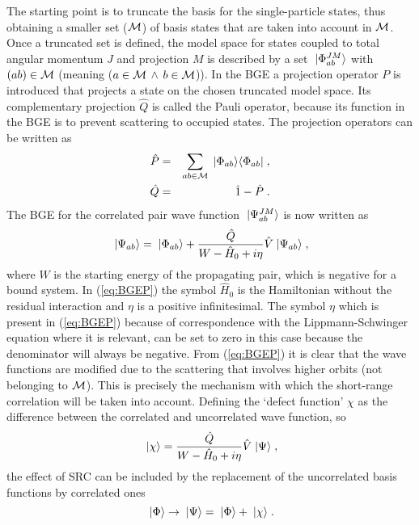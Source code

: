 The starting point is to truncate the basis for the single-particle states,
thus obtaining a smaller
set ($\calM$) of basis states that are taken into account in $\calM$. 
Once a truncated set is defined,
the model
space for states coupled to total angular momentum $J$ and projection $M$ is
described by a set $\;| \Phi^{JM}_{ab} \rangle$ with 
 $(ab) \in \calM$ (meaning ($a\in\calM$ $\wedge$ $b\in\calM$)). 
In the BGE 
a projection operator $P$ is introduced that projects a state on the chosen
truncated model space. Its complementary projection $\hat{Q}$ is called
the Pauli operator, because its function in the BGE is to prevent scattering
to occupied states. The projection operators can be written as
%
	\begin{eqnarray}
		\hat{P}
	&=&
		\sum_{ab \in \calM}
		\ket{ \Phi_{ab} }
		\bra{ \Phi_{ab} }
	\;,
	\nonumber \\
		\hat{Q}
	&=&
		\hat{1}-\hat{P}
	\;.
	\end{eqnarray}
%
The BGE for the correlated pair wave function $\;| \Psi^{JM}_{ab} \rangle$ is 
now written as
%
	\begin{equation}
		\;| \Psi_{ab} \rangle
	=
		\;| \Phi_{ab} \rangle
	+
		\frac{\hat{Q}}
		{W - \hat{H}_0 + i\eta}
		\hat{V}
		\;| \Psi_{ab} \rangle
	\label{eq:BGEP}
	\;,
	\end{equation}
%
where $W$ is the starting energy of the propagating pair, which is negative for
a bound system. In (\ref{eq:BGEP}) the symbol $\hat{H}_0$ is the Hamiltonian 
without the residual interaction and $\eta$
is a positive 
infinitesimal. The symbol $\eta$ which is present in (\ref{eq:BGEP}) because
of correspondence with the Lippmann-Schwinger equation where it is relevant,
can be set to zero in this case because the denominator will always be 
negative.
{}From (\ref{eq:BGEP}) it is clear that the wave functions are modified
due to the scattering that involves higher orbits (not belonging to $\calM$).
This is precisely the mechanism with which the short-range correlation will 
be taken into account. Defining the `defect function' $\chi$  as the 
difference between the correlated and uncorrelated wave function, so
%
	\begin{equation}
		\;| \chi \rangle
	=
		\frac{\hat{Q}}{W - \hat{H}_0 +i\eta}\hat{V} \;| \Psi \rangle
	\label{eq:def}
	\;,
	\end{equation}
%
the effect of SRC can be included by the replacement of the uncorrelated
basis functions by correlated ones
%
	\begin{equation}
		\;| \Phi \rangle
	\rightarrow
		\;| \Psi \rangle
	= 
		\;| \Phi \rangle + \;| \chi \rangle
	\label{eq:def2}
	\;.
	\end{equation}
%

